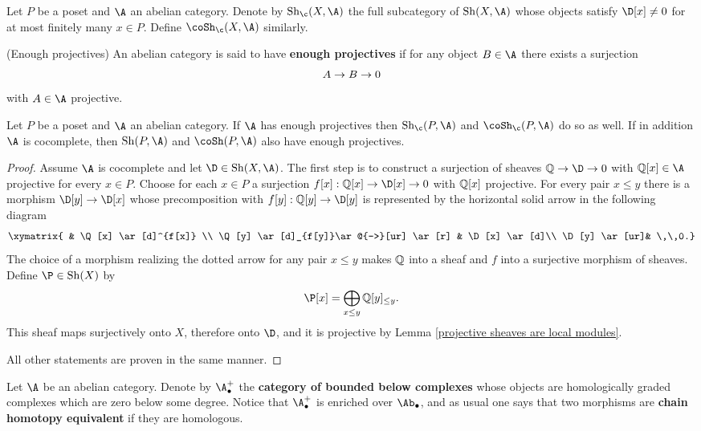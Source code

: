 \documentclass[thesis.tex]{subfiles}
\begin{document}
\begin{definition} \label{sheaves and cosheaves with compact suport}
	Let $P$ be a poset and $\A$ an abelian category.
	Denote by $\Sh_{\c}(X,\A)$ the full subcategory of $\Sh(X,\A)$ whose objects satisfy $\D[x]\neq0$ for at most finitely many $x\in P$.
	Define $\coSh_{\c}(X,\A)$ similarly.
\end{definition}

\begin{definition}(Enough projectives) An abelian category is said to have \textbf{enough projectives} if for any object $B\in\A$ there exists a surjection $$A\to B\to0\vspace*{-5pt}$$ with $A\in\A$ projective.
\end{definition}

\begin{lemma}Let $P$ be a poset and $\A$ an abelian category.
If $\A$ has enough projectives then $\Sh_{\c}(P,\A)$ and $\coSh_{\c}(P,\A)$ do so as well.
If in addition $\A$ is cocomplete, then $\Sh(P,\A)$ and $\coSh(P,\A)$ also have enough projectives.

\begin{proof}
Assume $\A$ is cocomplete and let $\D\in\Sh(X,\A)$.
The first step is to construct a surjection of sheaves $\Q\to\D\to0$ with $\Q[x]\in\A$ projective for every $x\in P$.
Choose for each $x\in P$ a surjection $f[x]:\Q[x]\to\D[x]\to0$ with $\mathbb{Q}[x]$ projective.
For every pair $x\leq y$ there is a morphism $\D[y]\to\D[x]$ whose precomposition with $f[y]:\Q[y]\to\D[y]$ is represented by the horizontal solid arrow in the following diagram $$\xymatrix
{  & \Q[x] \ar[d]^{f[x]} \\
\Q[y] \ar[d]_{f[y]}\ar@{-->}[ur] \ar[r] & \D[x] \ar[d]\\
\D[y] \ar[ur]& \,\,0.}$$
The choice of a morphism realizing the dotted arrow for any pair $x\leq y$ makes $\mathbb{Q}$ into a sheaf and $f$ into a surjective morphism of sheaves.
Define $\P\in\Sh(X)$ by $$\P[x]=\bigoplus_{x\leq y}\Q[y]_{\leq y}.$$ This sheaf maps surjectively onto $X$, therefore onto $\D$, and it is projective by Lemma \ref{projective sheaves are local modules}.

All other statements are proven in the same manner.
\end{proof}
\end{lemma}

\begin{notation} Let $\A$ be an abelian category.
Denote by $\A_\bullet^{+}$ the \textbf{category of bounded below complexes} whose objects are homologically graded complexes which are zero below some degree.
Notice that $\A_\bullet^{+}$ is enriched over $\Ab_\bullet$, and as usual one says that two morphisms are \textbf{chain homotopy equivalent} if they are homologous.
\end{notation}
\end{document}
